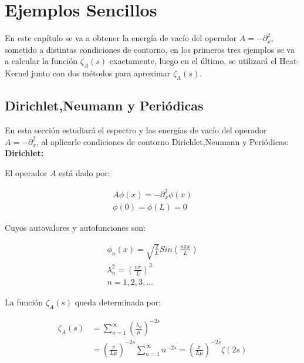\chapter{Ejemplos Sencillos}

  
En este capítulo se va a obtener la energía de vacío del operador $A = - \partial ^2 _x$, sometido a distintas condiciones de contorno, en los primeros tres ejemplos se va a calcular la función $ \zeta _A (s) $ exactamente, luego en el último, se utilizará el Heat-Kernel junto con dos métodos para aproximar $\zeta _A (s)$.

\section{Dirichlet,Neumann y Periódicas}

En esta sección estudiará el espectro y las energías de vacío del operador $A = - \partial ^2 _x$, al aplicarle condiciones de contorno Dirichlet,Neumann y Periódicas: \\

\textbf{Dirichlet:}

El operador $A$ está dado por:

\begin{equation}
\begin{array}{c}
	A \phi (x) = - \partial _x ^2 \phi (x) \\[10pt]
    \phi (0) = \phi(L) = 0 
\end{array}
\end{equation}


Cuyos autovalores y autofunciones son: 

\begin{equation}
\begin{array}{c}
	\phi _n (x) = \sqrt{\frac{2}{L}} Sin( \frac{n \pi x}{L} ) \\[10pt]
	\lambda _n ^2 = \left( \frac{n \pi }{L} \right) ^2 \\[10pt]
	n = 1,2,3, ...
\end{array}
\end{equation}

La función $\zeta _A (s)$ queda determinada por:

\begin{equation}
\begin{aligned}
\zeta _A (s) &= 
\sum _{n=1} ^{\infty} \left( \frac{\lambda _n}{\mu} \right) ^{-2s}  \\[10pt]
&= \left(  \frac{\pi}{L \mu} \right) ^{-2s}   \sum _{n=1} ^{\infty} n ^{-2s} = 
\left( \frac{\pi}{L \mu} \right) ^{-2s}  \zeta (2s) \\[10pt]
\end{aligned}
\end{equation}


